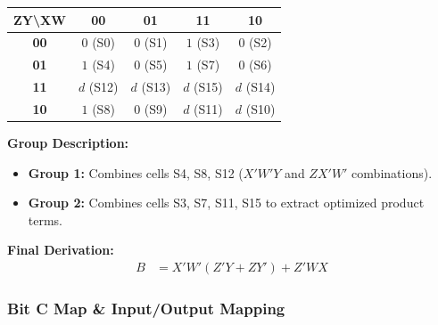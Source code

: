 \documentclass[journal,12pt,onecolumn]{IEEEtran}
\begin{document}
		\begin{table}[H]
			\centering
			\begin{tabular}{|c|c|c|c|c|}
				\hline
				\textbf{ZY\textbackslash XW} & \textbf{00} & \textbf{01} & \textbf{11} & \textbf{10} \\
				\hline
				\textbf{00} & $0$ (S0) & $0$ (S1) & \cellcolor{grpRed}$1$ (S3) & $0$ (S2) \\
				\hline
				\textbf{01} & \cellcolor{grpGreen}$1$ (S4) & $0$ (S5) & \cellcolor{grpRed}$1$ (S7) & $0$ (S6) \\
				\hline
				\textbf{11} & \cellcolor{grpGreen}$d$ (S12) & $d$ (S13) & \cellcolor{grpRed}$d$ (S15) & \cellcolor{grpRed}$d$ (S14) \\
				\hline
				\textbf{10} & \cellcolor{grpGreen}$1$ (S8) & $0$ (S9) & \cellcolor{grpRed}$d$ (S11) & $d$ (S10) \\
				\hline
			\end{tabular}
		\end{table}
		
		\begin{justify}
			\textbf{Group Description:}
			\begin{itemize}
				\item \textbf{Group 1:} Combines cells S4, S8, S12 ($X'W'Y$ and $ZX'W'$ combinations).
				\item \textbf{Group 2:} Combines cells S3, S7, S11, S15 to extract optimized product terms.
			\end{itemize}
			
			\textbf{Final Derivation:}
			\begin{align}
				B &= X'W'(Z'Y + ZY') + Z'WX
			\end{align}
		\end{justify}
		
		\vspace{1em}
		\subsubsection{Bit C Map \& Input/Output Mapping}
		
\end{document}
